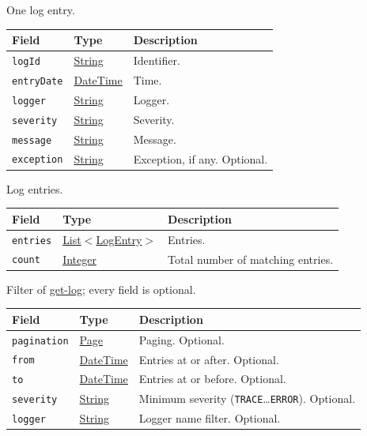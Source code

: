 \documentclass[a4paper]{arrowhead}
\newcommand{\mref}[1]{{\textcolor{ArrowheadPurple}{\hyperref[sec:model:#1]{#1}}}}
\newcommand{\oref}[1]{{\textcolor{ArrowheadBlue}{\hyperref[sec:operations:#1]{#1}}}}
\newcommand{\pref}[1]{{\textcolor{ArrowheadGrey}{\hyperref[sec:model:primitives:#1]{#1}}}}
\begin{document}
One log entry.

{\small
\begin{longtable}{|p{3.9cm}|p{4.4cm}|p{7.5cm}|}

\hline
\rowcolor{gray!33} Field & Type & Description \\ \hline
\endhead
\texttt{logId} & \pref{String} & Identifier. \\ \hline
\texttt{entryDate} & \pref{DateTime} & Time. \\ \hline
\texttt{logger} & \pref{String} & Logger. \\ \hline
\texttt{severity} & \pref{String} & Severity. \\ \hline
\texttt{message} & \pref{String} & Message. \\ \hline
\texttt{exception} & \pref{String} & Exception, if any. Optional. \\ \hline
\end{longtable}
}

Log entries.

{\small
\begin{longtable}{|p{3.9cm}|p{4.4cm}|p{7.5cm}|}

\hline
\rowcolor{gray!33} Field & Type & Description \\ \hline
\endhead
\texttt{entries} & \pref{List}$<$\mref{LogEntry}$>$ & Entries. \\ \hline
\texttt{count} & \pref{Integer} & Total number of matching entries. \\ \hline
\end{longtable}
}

Filter of \oref{get-log}; every field is optional.

{\small
\begin{longtable}{|p{3.9cm}|p{4.4cm}|p{7.5cm}|}

\hline
\rowcolor{gray!33} Field & Type & Description \\ \hline
\endhead
\texttt{pagination} & \mref{Page} & Paging. Optional. \\ \hline
\texttt{from} & \pref{DateTime} & Entries at or after. Optional. \\ \hline
\texttt{to} & \pref{DateTime} & Entries at or before. Optional. \\ \hline
\texttt{severity} & \pref{String} & Minimum severity (\texttt{TRACE}\ldots\texttt{ERROR}). Optional. \\ \hline
\texttt{logger} & \pref{String} & Logger name filter. Optional. \\ \hline
\end{longtable}
}
\end{document}
